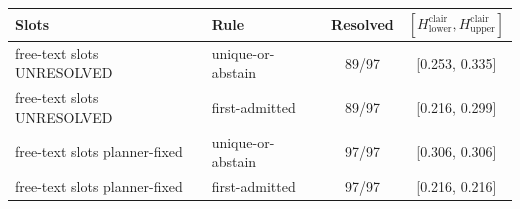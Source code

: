 \begin{tabular}{llcc}
\toprule
Slots & Rule & Resolved & $[H^{\mathrm{clair}}_{\mathrm{lower}}, H^{\mathrm{clair}}_{\mathrm{upper}}]$ \\
\midrule
free-text slots UNRESOLVED & unique-or-abstain & 89/97 & [0.253, 0.335] \\
free-text slots UNRESOLVED & first-admitted & 89/97 & [0.216, 0.299] \\
free-text slots planner-fixed & unique-or-abstain & 97/97 & [0.306, 0.306] \\
free-text slots planner-fixed & first-admitted & 97/97 & [0.216, 0.216] \\
\bottomrule
\end{tabular}
